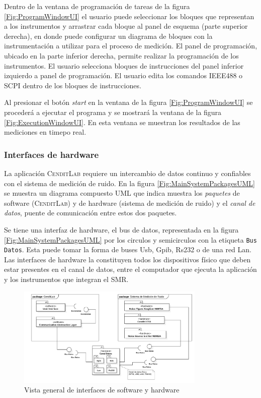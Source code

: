 \documentclass[paper=a4,oneside,fontsize=12pt]{article}
\newcommand{\AppName}{\textsc{CenditLab}\xspace}
\newcommand{\smr}{sistema de medición de ruido}
\newcommand{\SMR}{SMR\xspace}
\begin{document}
	Dentro de la ventana de programación de tareas de la figura \ref{Fig:ProgramWindowUI} el usuario puede seleccionar los bloques que representan a los instrumentos y arrastrar cada bloque al panel de esquema (parte superior derecha), en donde puede configurar un diagrama de bloques con la instrumentación a utilizar para el proceso de medición. El panel de programación,  ubicado en la parte inferior derecha, permite realizar la programación de los instrumentos. El usuario selecciona bloques de instrucciones del panel inferior izquierdo a panel de programación. El usuario edita los comandos IEEE488 o SCPI dentro de los bloques de instrucciones. 

	Al presionar el botón \emph{start} en la ventana de la figura \ref{Fig:ProgramWindowUI} se procederá a ejecutar el programa y se mostrará la ventana de la figura \ref{Fig:ExecutionWindowUI}. En  esta ventana se muestran los resultados de las mediciones en timepo real.
	
	\subsubsection{Interfaces de hardware}
	
	La aplicación \AppName requiere un intercambio de datos continuo y confiables con el \smr. En la figura \ref{Fig:MainSystemPackagesUML} se muestra un diagrama compuesto UML que indica muestra los \emph{paquetes} de software (\AppName) y de hardware (\smr) y el \emph{canal de datos}, puente de comunicación entre estos dos paquetes.
	
	Se tiene una interfaz de hardware, el bus de datos, representada en la figura \ref{Fig:MainSystemPackagesUML} por los circulos y semicirculos con la etiqueta \texttt{Bus Datos}. Esta puede tomar la forma de buses Usb, Gpib, Rs232 o de una red Lan. Las interfaces de hardware la constituyen todos los dispositivos físico que deben estar presentes en el canal de datos, entre el computador que ejecuta la aplicación y los instrumentos que integran el \SMR.	
	
	\begin{figure}[H]
		\centering
		\includegraphics[width=0.8\textwidth]{Imagenes/MainSystemPackagesUML.pdf}
		\caption{Vista general de interfaces de software y hardware}
		\label{Fig:MainSystemPackagesUML2}
	\end{figure}
	
\end{document}

